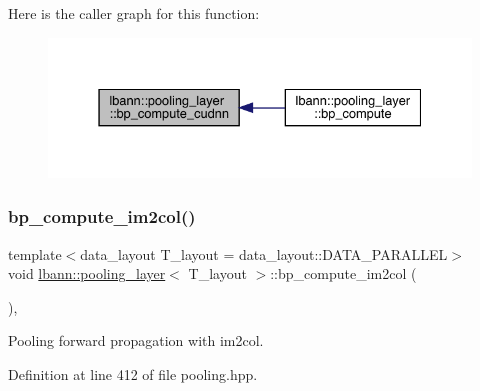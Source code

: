 Here is the caller graph for this function\+:\nopagebreak
\begin{figure}[H]
\begin{center}
\leavevmode
\includegraphics[width=331pt]{classlbann_1_1pooling__layer_a457b52475f27ab55985f1e47515e7c3b_icgraph}
\end{center}
\end{figure}
\mbox{\label{classlbann_1_1pooling__layer_a704aca0e1e5bba7d27b7755133e6d50b}} 
\subsubsection{\texorpdfstring{bp\+\_\+compute\+\_\+im2col()}{bp\_compute\_im2col()}}
{\footnotesize\ttfamily template$<$data\+\_\+layout T\+\_\+layout = data\+\_\+layout\+::\+D\+A\+T\+A\+\_\+\+P\+A\+R\+A\+L\+L\+EL$>$ \\
void \hyperlink{classlbann_1_1pooling__layer}{lbann\+::pooling\+\_\+layer}$<$ T\+\_\+layout $>$\+::bp\+\_\+compute\+\_\+im2col (\begin{DoxyParamCaption}{ }\end{DoxyParamCaption})\hspace{0.3cm}{\ttfamily [inline]}, {\ttfamily [private]}}



Pooling forward propagation with im2col. 



Definition at line 412 of file pooling.\+hpp.


